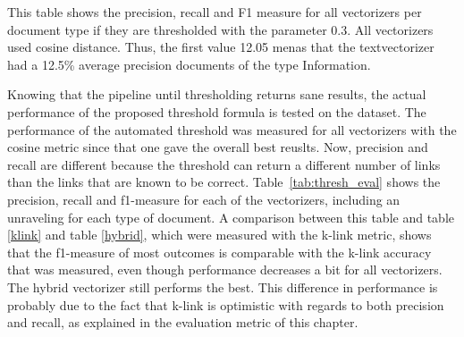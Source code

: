 \begin{table}
\caption{This table shows the precision, recall and F1 measure for all vectorizers per document type if they are thresholded with the parameter 0.3. All vectorizers used cosine distance. Thus, the first value 12.05 menas that the textvectorizer had a 12.5\% average precision documents of the type Information. }
\label{tab:thresh_eval}
\end{table}

Knowing that the pipeline until thresholding returns sane results, the actual performance
of the proposed threshold formula is tested on the dataset. The performance of the 
automated threshold was measured for all vectorizers with the cosine metric since that one gave the overall best reuslts. Now, precision and recall are different because the threshold can 
return a different number of links than the links that are known to be correct. Table~\ref{tab:thresh_eval} 
shows the precision, recall and f1-measure for each of the vectorizers, including an unraveling for
each type of document. A comparison between this table and table \ref{klink} and table \ref{hybrid}, which were measured with the k-link metric, shows that the f1-measure of most outcomes is comparable with the k-link accuracy that was measured, even though performance decreases a bit for all vectorizers. The hybrid vectorizer still performs the best. This difference in performance is probably due to the fact that k-link is optimistic with regards to both precision and recall, as explained in the evaluation metric of this chapter. %

\begin{table}

\end{table}
